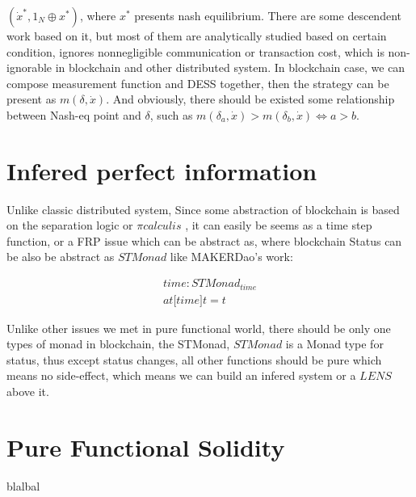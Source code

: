 \documentclass[twocolumn]{article}
\begin{document}
$(\dot{x}^*, 1_N\oplus x^*)$, where $x^*$ presents nash equilibrium. There are some descendent work based on it, but most of them are analytically studied based on certain condition, ignores nonnegligible communication or transaction cost, which is non-ignorable in blockchain and other distributed system. In blockchain case, we can compose measurement function and DESS together, then the strategy can be present as $m(\delta, \dot{x})$. And obviously, there should be existed some relationship between Nash-eq point and $\delta$, such as  $m(\delta_a, \dot{x}) > m(\delta_b, \dot{x}) \iff a > b$. 

\section{Infered perfect information}

Unlike classic distributed system,
Since some abstraction of blockchain is based on the separation logic or $\pi calculis$ \cite{linearblockchain}, it can easily be seems as a time step function, or a FRP issue which can be abstract as\cite{ElliottHudak97:Fran}, where blockchain Status can be also be abstract as $STMonad$ like MAKERDao\cite{dai}'s work:

\begin{gather}
  time: STMonad_{time}\\
  at \mathbb{[} time \mathbb{]}t = t
\end{gather}

Unlike other issues we met in pure functional world, there should be only one types of monad in blockchain, the STMonad, $STMonad$ is a Monad type for status, thus except status changes, all other functions should be pure which means no side-effect, which means we can build an infered system or a $LENS$\cite {lens} above it.


\section{Pure Functional Solidity}
blalbal



\end{document}
